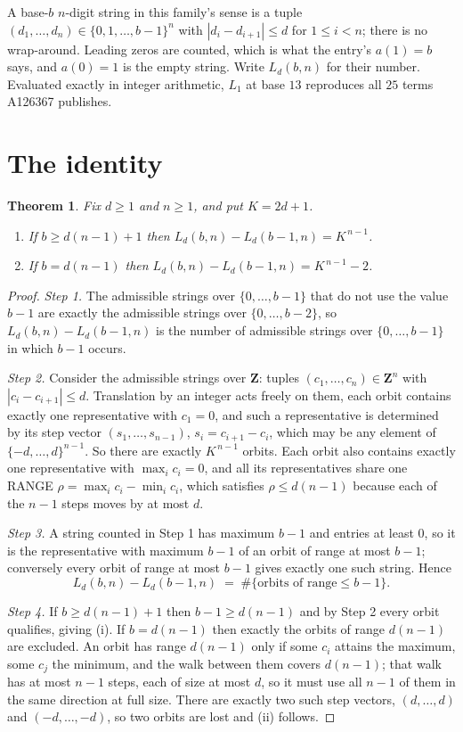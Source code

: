 \documentclass[11pt,a4paper]{article}
\theoremstyle{plain}
\newtheorem{theorem}{Theorem}
\theoremstyle{definition}
\begin{document}
A base-$b$ $n$-digit string in this family's sense is a tuple
$(d_1,\dots,d_n)\in\{0,1,\dots,b-1\}^{n}$ with $|d_i-d_{i+1}|\le d$ for $1\le i<n$; there
is no wrap-around. Leading zeros are counted, which is what the entry's $a(1)=b$ says, and
$a(0)=1$ is the empty string. Write $L_d(b,n)$ for their number. Evaluated exactly in integer
arithmetic, $L_{1}$ at base $13$ reproduces all $25$ terms A126367 publishes.

\section{The identity}

\begin{theorem}
Fix $d\ge1$ and $n\ge1$, and put $K=2d+1$.
\begin{enumerate}
\item[(i)] If $b\ge d(n-1)+1$ then $L_d(b,n)-L_d(b-1,n)=K^{\,n-1}$.
\item[(ii)] If $b=d(n-1)$ then $L_d(b,n)-L_d(b-1,n)=K^{\,n-1}-2$.
\end{enumerate}
\end{theorem}

\begin{proof}
\emph{Step 1.} The admissible strings over $\{0,\dots,b-1\}$ that do not use the value $b-1$
are exactly the admissible strings over $\{0,\dots,b-2\}$, so $L_d(b,n)-L_d(b-1,n)$ is the
number of admissible strings over $\{0,\dots,b-1\}$ in which $b-1$ occurs.

\emph{Step 2.} Consider the admissible strings over $\mathbf{Z}$: tuples
$(c_1,\dots,c_n)\in\mathbf{Z}^{n}$ with $|c_i-c_{i+1}|\le d$. Translation by an integer acts
freely on them, each orbit contains exactly one representative with $c_1=0$, and such a
representative is determined by its step vector $(s_1,\dots,s_{n-1})$, $s_i=c_{i+1}-c_i$,
which may be any element of $\{-d,\dots,d\}^{n-1}$. So there are exactly $K^{\,n-1}$ orbits.
Each orbit also contains exactly one representative with $\max_i c_i=0$, and all its
representatives share one RANGE $\rho=\max_ic_i-\min_ic_i$, which satisfies
$\rho\le d(n-1)$ because each of the $n-1$ steps moves by at most $d$.

\emph{Step 3.} A string counted in Step 1 has maximum $b-1$ and entries at least $0$, so it is
the representative with maximum $b-1$ of an orbit of range at most $b-1$; conversely every orbit
of range at most $b-1$ gives exactly one such string. Hence
\[
L_d(b,n)-L_d(b-1,n)\;=\;\#\{\text{orbits of range}\le b-1\} .
\]

\emph{Step 4.} If $b\ge d(n-1)+1$ then $b-1\ge d(n-1)$ and by Step 2 every orbit qualifies,
giving (i). If $b=d(n-1)$ then exactly the orbits of range $d(n-1)$ are excluded. An orbit has
range $d(n-1)$ only if some $c_i$ attains the maximum, some $c_j$ the minimum, and the walk
between them covers $d(n-1)$; that walk has at most $n-1$ steps, each of size at most $d$, so it
must use all $n-1$ of them in the same direction at full size. There are exactly two such step
vectors, $(d,\dots,d)$ and $(-d,\dots,-d)$, so two orbits are lost and (ii) follows.
\end{proof}
\end{document}

